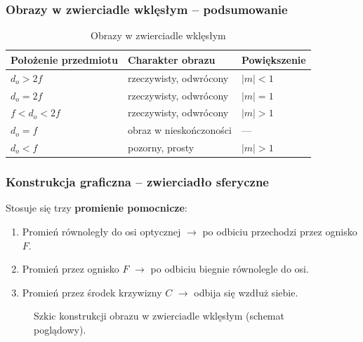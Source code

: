 \documentclass[12pt,a4paper]{article}
\begin{document}
\subsubsection{Obrazy w zwierciadle wklęsłym -- podsumowanie}

\begin{table}[H]
\centering
\renewcommand{\arraystretch}{1.4}
\begin{tabular}{lll}
\toprule
\textbf{Położenie przedmiotu} & \textbf{Charakter obrazu} & \textbf{Powiększenie} \\
\midrule
$d_o > 2f$ & rzeczywisty, odwrócony & $|m|<1$ \\
$d_o = 2f$ & rzeczywisty, odwrócony & $|m|=1$ \\
$f < d_o < 2f$ & rzeczywisty, odwrócony & $|m|>1$ \\
$d_o = f$ & obraz w nieskończoności & --- \\
$d_o < f$ & pozorny, prosty & $|m|>1$ \\
\bottomrule
\end{tabular}
\caption{Obrazy w zwierciadle wklęsłym}
\end{table}

\subsubsection{Konstrukcja graficzna -- zwierciadło sferyczne}

Stosuje się trzy \textbf{promienie pomocnicze}:
\begin{enumerate}
  \item Promień równoległy do osi optycznej $\to$ po odbiciu przechodzi przez ognisko $F$.
  \item Promień przez ognisko $F$ $\to$ po odbiciu biegnie równolegle do osi.
  \item Promień przez środek krzywizny $C$ $\to$ odbija się wzdłuż siebie.
\end{enumerate}

\begin{figure}[H]
\centering
{}
\caption{Szkic konstrukcji obrazu w zwierciadle wklęsłym (schemat poglądowy).}
\end{figure}
\end{document}
